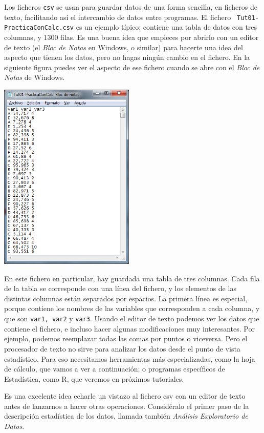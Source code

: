 \documentclass[10pt,a4paper]{article}
\newcounter {cont01}
\begin{document}
Los ficheros {\tt csv} se usan para guardar datos de una forma sencilla, en ficheros de texto,
facilitando así el intercambio de datos entre programas. El fichero  {\tt
Tut01-PracticaConCalc.csv} es un ejemplo típico: contiene una tabla de datos con tres columnas, y
1300 filas. Es una buena idea que empieces por abrirlo con un editor de texto (el {\em Bloc de
Notas} en Windows, o similar) para hacerte una idea del aspecto que tienen los datos, pero no hagas
ningún cambio en el fichero. En la siguiente figura puedes ver el aspecto de ese fichero cuando se
abre con el  {\em Bloc de Notas} de Windows.
    \begin{center}
    \includegraphics[height=9cm]{../fig/Tut00-AbriendoFicheroCsvBlocDeNotas.png}
    \end{center}
En este fichero en particular, hay guardada una tabla de tres columnas. Cada fila de la tabla se
corresponde con una línea del fichero, y los elementos de las distintas columnas están separados
por espacios. La primera línea es especial, porque contiene los nombres de las variables que
corresponden a cada columna, y que son {\tt var1, var2} y {\tt var3}. Usando el editor de texto
podemos ver los datos que contiene el fichero, e incluso hacer algunas modificaciones muy
interesantes. Por ejemplo, podemos reemplazar todas las comas por puntos o viceversa. Pero el
procesador de texto no sirve para analizar los datos desde el punto de vista estadístico. Para eso
necesitamos herramientas más especializadas, como la hoja de cálculo, que vamos a ver a
continuación; o programas específicos de Estadística, como R, que veremos en próximos tutoriales.

Es una excelente idea echarle un vistazo al fichero csv con un editor de texto antes de lanzarnos a
hacer otras operaciones. Considéralo el primer paso de la descripción estadística de los datos,
llamada también {\em Análisis Exploratorio de Datos}.
\end{document}
